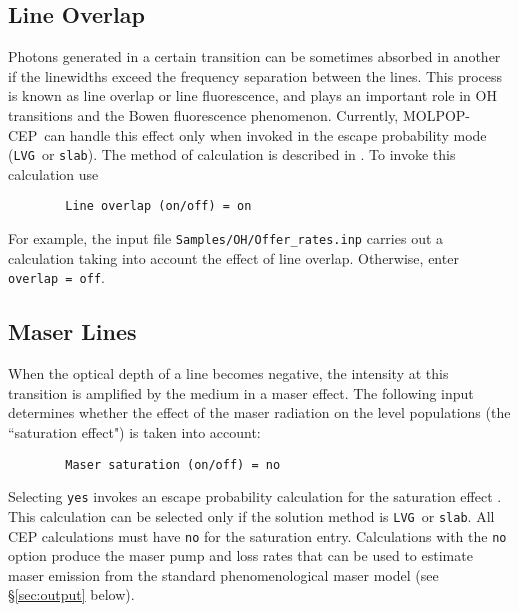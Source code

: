 \documentclass[12pt]{article}
\def\separation {0.5cm}
\def\M{MOLPOP-CEP}
\def\LVG      {\texttt{LVG}}
\def\slab     {\texttt{slab}}
\begin{document}
\subsection{Line Overlap}
Photons generated in a certain transition can be sometimes absorbed in another
if the linewidths exceed the frequency separation between the lines. This
process is known as line overlap or line fluorescence, and plays an important
role in OH transitions and the Bowen fluorescence phenomenon. Currently, \M\
can handle this effect only when invoked in the escape probability mode (\LVG\
or \slab). The method of calculation is described in \cite{lockett_elitzur89}.
To invoke this calculation use \vspace{\separation}
\begin{verbatim}
        Line overlap (on/off) = on
\end{verbatim}
For example, the input file \texttt{Samples/OH/Offer\_rates.inp} carries out a
calculation taking into account the effect of line overlap. Otherwise, enter
{\tt overlap = off}.


\subsection{Maser Lines}
When the optical depth of a line becomes negative, the intensity at this
transition is amplified by the medium in a maser effect. The following input
determines whether the effect of the maser radiation on the level populations
(the ``saturation effect") is taken into account:

\vspace{\separation}
\begin{verbatim}
        Maser saturation (on/off) = no
\end{verbatim}
Selecting {\tt yes} invokes an escape probability calculation for the
saturation effect \citep[see \S 5.3 in][]{elitzur92}. This calculation can be
selected only if the solution method is \LVG\ or \slab. All CEP calculations
must have {\tt no} for the saturation entry. Calculations with the {\tt no}
option produce the maser pump and loss rates that can be used to estimate maser
emission from the standard phenomenological maser model (see \S\ref{sec:output} below).




\end{document}
